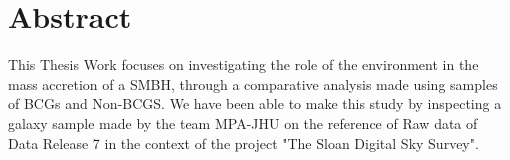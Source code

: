 \chapter*{Abstract}
This Thesis Work focuses on investigating the role of the environment in the mass accretion of a SMBH, through a comparative analysis made using samples of BCGs and Non-BCGS. %
We have been able to make this study by inspecting a galaxy sample made by the team MPA-JHU on the reference of Raw data of Data Release 7 in the context of the project "The Sloan Digital Sky Survey". 

